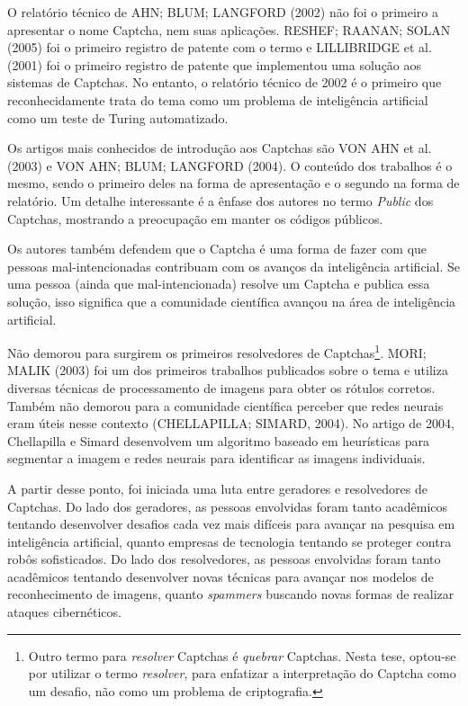 \documentclass[12pt,twoside,brazilian]{book}
\begin{document}
O relatório técnico de AHN; BLUM; LANGFORD (2002) não foi o primeiro a
apresentar o nome Captcha, nem suas aplicações. RESHEF; RAANAN; SOLAN
(2005) foi o primeiro registro de patente com o termo e LILLIBRIDGE et
al. (2001) foi o primeiro registro de patente que implementou uma
solução aos sistemas de Captchas. No entanto, o relatório técnico de
2002 é o primeiro que reconhecidamente trata do tema como um problema de
inteligência artificial como um teste de Turing automatizado.

Os artigos mais conhecidos de introdução aos Captchas são VON AHN et al.
(2003) e VON AHN; BLUM; LANGFORD (2004). O conteúdo dos trabalhos é o
mesmo, sendo o primeiro deles na forma de apresentação e o segundo na
forma de relatório. Um detalhe interessante é a ênfase dos autores no
termo \emph{Public} dos Captchas, mostrando a preocupação em manter os
códigos públicos.

Os autores também defendem que o Captcha é uma forma de fazer com que
pessoas mal-intencionadas contribuam com os avanços da inteligência
artificial. Se uma pessoa (ainda que mal-intencionada) resolve um
Captcha e publica essa solução, isso significa que a comunidade
científica avançou na área de inteligência artificial.

Não demorou para surgirem os primeiros resolvedores de
Captchas\footnote{Outro termo para \emph{resolver} Captchas é
  \emph{quebrar} Captchas. Nesta tese, optou-se por utilizar o termo
  \emph{resolver}, para enfatizar a interpretação do Captcha como um
  desafio, não como um problema de criptografia.}. MORI; MALIK (2003)
foi um dos primeiros trabalhos publicados sobre o tema e utiliza
diversas técnicas de processamento de imagens para obter os rótulos
corretos. Também não demorou para a comunidade científica perceber que
redes neurais eram úteis nesse contexto (CHELLAPILLA; SIMARD, 2004). No
artigo de 2004, Chellapilla e Simard desenvolvem um algoritmo baseado em
heurísticas para segmentar a imagem e redes neurais para identificar as
imagens individuais.

A partir desse ponto, foi iniciada uma luta entre geradores e
resolvedores de Captchas. Do lado dos geradores, as pessoas envolvidas
foram tanto acadêmicos tentando desenvolver desafios cada vez mais
difíceis para avançar na pesquisa em inteligência artificial, quanto
empresas de tecnologia tentando se proteger contra robôs sofisticados.
Do lado dos resolvedores, as pessoas envolvidas foram tanto acadêmicos
tentando desenvolver novas técnicas para avançar nos modelos de
reconhecimento de imagens, quanto \emph{spammers} buscando novas formas
de realizar ataques cibernéticos.
\end{document}
